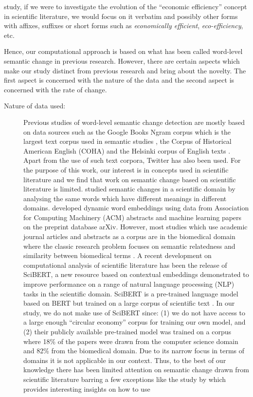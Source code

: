 \documentclass[output=paper]{langsci/langscibook}
\begin{document}
study, if we were to investigate the evolution of the ``economic efficiency'' concept in scientific literature, we would focus on it verbatim and possibly other forms with affixes, suffixes or short forms such as \emph{economically efficient}, \emph{eco-efficiency}, etc.

Hence, our computational approach is based on what has been called word-level semantic change in previous research. However, there are certain aspects which make our study distinct from previous research and bring about the novelty. The first aspect is concerned with the nature of the data and the second aspect is concerned with the rate of change.

\begin{description}
\item[Nature of data used:] Previous studies of word-level semantic change detection are mostly based on data sources such as the Google Books Ngram corpus which is the largest text corpus used in semantic studies \citep{michel2011quantitative,gulordava-baroni-2011-distributional,hamilton-etal-2016-diachronic,jatowt:2014:fas:2740769.2740809,xu15,dubossarsky-etal-2017-outta}, the Corpus of Historical American English (COHA) \citep{hamilton-etal-2016-diachronic,neuman2017information} and the Helsinki corpus of English texts \citep{sagi-etal-2009-semantic}. Apart from the use of such text corpora, Twitter \citep{mitra2015automatic} has also been used. For the purpose of this work, our interest is in concepts used in scientific literature and we find that work on semantic change based on scientific literature is limited. \citet{chen2018semantic} studied semantic changes in a scientific domain by analysing the same words which have different meanings in different domains. \citet{rudolphb18-dynamicembforlangevo} developed dynamic word embeddings using data from Association for Computing Machinery (ACM) abstracts and machine learning papers on the preprint database arXiv. However, most studies which use academic journal articles and abstracts as a corpus are in the biomedical domain where the classic research problem focuses on semantic relatedness and similarity between biomedical terms \citep{zhu2017semantic}. A recent development on computational analysis of scientific literature has been the release of SciBERT, a new resource based on contextual embeddings demonstrated to improve performance on a range of natural language processing (NLP) tasks in the scientific domain. SciBERT is a pre-trained language model based on BERT but trained on a large corpus of scientific text \citep{beltagy2019scibert}. In our study, we do not make use of SciBERT since: (1) we do not have access to a large enough ``circular economy'' corpus for training our own model, and (2) their publicly available pre-trained model was trained on a corpus where 18\% of the papers were drawn from the computer science domain and 82\% from the biomedical domain. Due to its narrow focus in terms of domains it is not applicable in our context. Thus, to the best of our knowledge there has been limited attention on semantic change drawn from scientific literature barring a few exceptions like the study by \citet{dridi2019leap2trend} which provides interesting insights on how to use 
\end{description}
\end{document}
